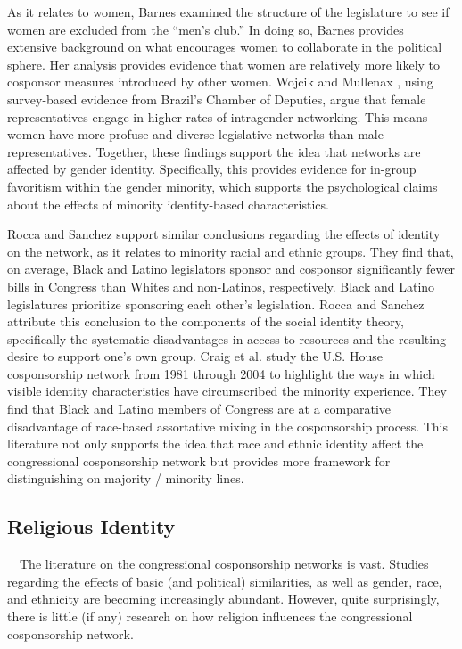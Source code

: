 \documentclass[Royal,times,sageh]{sagej}
\begin{document}
As it relates to women, Barnes \citeyearpar{barnes2015} examined the
structure of the legislature to see if women are excluded from the
``men's club.'' In doing so, Barnes provides extensive background on
what encourages women to collaborate in the political sphere. Her
analysis provides evidence that women are relatively more likely to
cosponsor measures introduced by other women. Wojcik and Mullenax
\citeyearpar{wojcik}, using survey-based evidence from Brazil's Chamber
of Deputies, argue that female representatives engage in higher rates of
intragender networking. This means women have more profuse and diverse
legislative networks than male representatives. Together, these findings
support the idea that networks are affected by gender identity.
Specifically, this provides evidence for in-group favoritism within the
gender minority, which supports the psychological claims about the
effects of minority identity-based characteristics.

Rocca and Sanchez \citeyearpar{rocca} support similar conclusions
regarding the effects of identity on the network, as it relates to
minority racial and ethnic groups. They find that, on average, Black and
Latino legislators sponsor and cosponsor significantly fewer bills in
Congress than Whites and non-Latinos, respectively. Black and Latino
legislatures prioritize sponsoring each other's legislation. Rocca and
Sanchez \citeyearpar{rocca} attribute this conclusion to the components
of the social identity theory, specifically the systematic disadvantages
in access to resources and the resulting desire to support one's own
group. Craig et al. \citeyearpar{craig2015} study the U.S. House
cosponsorship network from 1981 through 2004 to highlight the ways in
which visible identity characteristics have circumscribed the minority
experience. They find that Black and Latino members of Congress are at a
comparative disadvantage of race-based assortative mixing in the
cosponsorship process. This literature not only supports the idea that
race and ethnic identity affect the congressional cosponsorship network
but provides more framework for distinguishing on majority / minority
lines.

\hypertarget{religious-identity}{%
\subsection{Religious Identity}\label{religious-identity}}

~~The literature on the congressional cosponsorship networks is vast.
Studies regarding the effects of basic (and political) similarities, as
well as gender, race, and ethnicity are becoming increasingly abundant.
However, quite surprisingly, there is little (if any) research on how
religion influences the congressional cosponsorship network.
\end{document}
